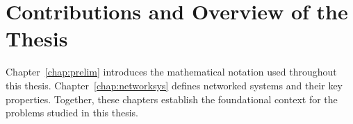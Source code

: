 


\section{Contributions and Overview of the Thesis}
Chapter~\ref{chap:prelim} introduces the mathematical notation used throughout this thesis. Chapter~\ref{chap:networksys} defines networked systems and their key properties. Together, these chapters establish the foundational context for the problems studied in this thesis.

